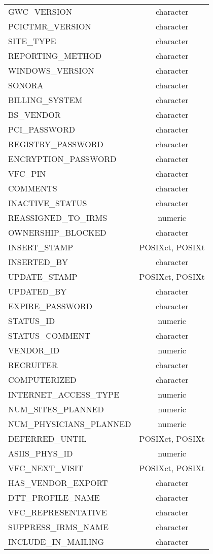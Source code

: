 \documentclass[
  letterpaper,
  DIV=11,
  numbers=noendperiod]{scrreprt}
\begin{document}
\begin{longtable}{lc}
GWC\_VERSION & character \\ 
PCICTMR\_VERSION & character \\ 
SITE\_TYPE & character \\ 
REPORTING\_METHOD & character \\ 
WINDOWS\_VERSION & character \\ 
SONORA & character \\ 
BILLING\_SYSTEM & character \\ 
BS\_VENDOR & character \\ 
PCI\_PASSWORD & character \\ 
REGISTRY\_PASSWORD & character \\ 
ENCRYPTION\_PASSWORD & character \\ 
VFC\_PIN & character \\ 
COMMENTS & character \\ 
INACTIVE\_STATUS & character \\ 
REASSIGNED\_TO\_IRMS & numeric \\ 
OWNERSHIP\_BLOCKED & character \\ 
INSERT\_STAMP & POSIXct, POSIXt \\ 
INSERTED\_BY & character \\ 
UPDATE\_STAMP & POSIXct, POSIXt \\ 
UPDATED\_BY & character \\ 
EXPIRE\_PASSWORD & character \\ 
STATUS\_ID & numeric \\ 
STATUS\_COMMENT & character \\ 
VENDOR\_ID & numeric \\ 
RECRUITER & character \\ 
COMPUTERIZED & character \\ 
INTERNET\_ACCESS\_TYPE & numeric \\ 
NUM\_SITES\_PLANNED & numeric \\ 
NUM\_PHYSICIANS\_PLANNED & numeric \\ 
DEFERRED\_UNTIL & POSIXct, POSIXt \\ 
ASIIS\_PHYS\_ID & numeric \\ 
VFC\_NEXT\_VISIT & POSIXct, POSIXt \\ 
HAS\_VENDOR\_EXPORT & character \\ 
DTT\_PROFILE\_NAME & character \\ 
VFC\_REPRESENTATIVE & character \\ 
SUPPRESS\_IRMS\_NAME & character \\ 
INCLUDE\_IN\_MAILING & character \\ 

\end{longtable}
\end{document}
